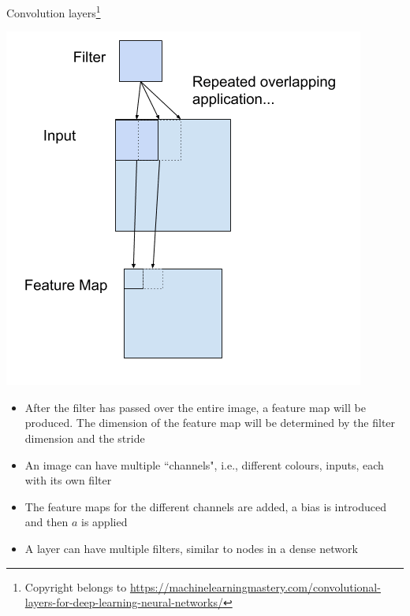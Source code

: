 \documentclass{beamer}
\begin{document}
\begin{frame}{Convolution layers\footnote{Copyright belongs to \url{https://machinelearningmastery.com/convolutional-layers-for-deep-learning-neural-networks/}}}
\begin{minipage}{0.39\linewidth}
\includegraphics[width=\textwidth]{Images/cfilter.png}
\end{minipage}
\begin{minipage}{0.59\linewidth}
\begin{itemize}
\item After the filter has passed over the entire image, a feature map will be produced. The dimension of the feature map will be determined by the filter dimension and the stride
\item An image can have multiple ``channels", i.e., different colours, inputs, each with its own filter
\item The feature maps for the different channels are added, a bias is introduced and then $a$ is applied 
\item A layer can have multiple filters, similar to nodes in a dense network
\end{itemize}
\end{minipage}
\end{frame}
\end{document}

